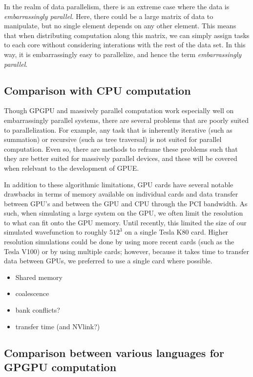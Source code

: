 In the realm of data parallelism, there is an extreme case where the data is \textit{embarrassingly parallel}.
Here, there could be a large matrix of data to manipulate, but no single element depends on any other element.
This means that when distributing computation along this matrix, we can simply assign tasks to each core without considering interations with the rest of the data set.
In this way, it is embarrassingly easy to parallelize, and hence the term \textit{embarrassingly parallel}.

\subsection{Comparison with CPU computation}

Though GPGPU and massively parallel computation work especially well on embarrassingly parallel systems, there are several problems that are poorly suited to parallelization.
For example, any task that is inherently iterative (such as summation) or recursive (such as tree traversal) is not suited for parallel computation.
Even so, there are methods to reframe these problems such that they are better suited for massively parallel devices, and these will be covered when relelvant to the development of GPUE.

In addition to these algorithmic limitations, GPU cards have several notable drawbacks in terms of memory available on individual cards and data transfer between GPU's and between the GPU and CPU through the PCI bandwidth.
As such, when simulating a large system on the GPU, we often limit the resolution to what can fit onto the GPU memory.
Until recently, this limited the size of our simulated wavefunction to roughly $512^3$ on a single Tesla K80 card.
Higher resolution simulations could be done by using more recent cards (such as the Tesla V100) or by using multiple cards; however, because it takes time to transfer data between GPUs, we preferred to use a single card where possible.

\begin{itemize}
\item Shared memory
\item coalescence
\item bank conflicts?
\item transfer time (and NVlink?)
\end{itemize}

\subsection{Comparison between various languages for GPGPU computation}

